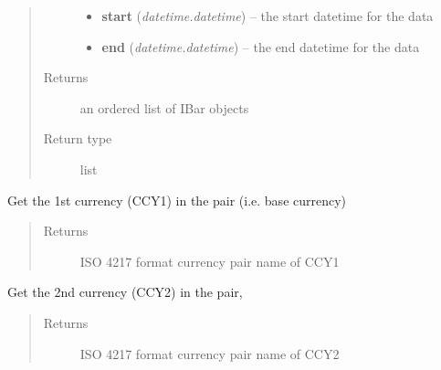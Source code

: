 \documentclass[letterpaper,10pt,english]{sphinxmanual}
\begin{document}
\begin{fulllineitems}
\begin{fulllineitems}
\begin{quote}
\begin{description}
\begin{itemize}
\item {} 
\textbf{start} (\emph{datetime.datetime}) -- the start datetime for the data

\item {} 
\textbf{end} (\emph{datetime.datetime}) -- the end datetime for the data

\end{itemize}

\item[{Returns}] \leavevmode
an ordered list of IBar objects

\item[{Return type}] \leavevmode
list

\end{description}\end{quote}

\end{fulllineitems}


\begin{fulllineitems}
\label{index:model.models.Instrument.get_ccy1}
Get the 1st currency (CCY1) in the pair (i.e. base currency)
\begin{quote}\begin{description}
\item[{Returns}] \leavevmode
ISO 4217 format currency pair name of CCY1

\end{description}\end{quote}

\end{fulllineitems}


\begin{fulllineitems}
\label{index:model.models.Instrument.get_ccy2}
Get the 2nd currency (CCY2) in the pair,
\begin{quote}\begin{description}
\item[{Returns}] \leavevmode
ISO 4217 format currency pair name of CCY2

\end{description}\end{quote}

\end{fulllineitems}


\end{fulllineitems}
\end{document}
